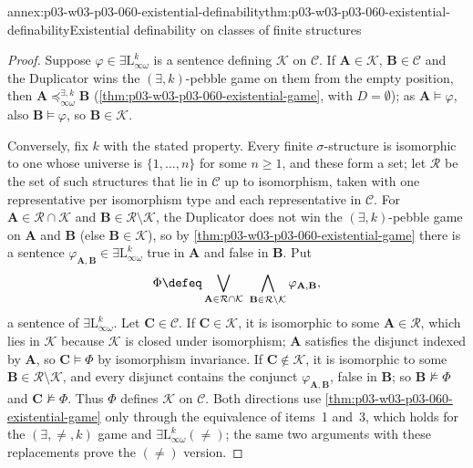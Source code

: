 \begin{annexitem}{annex:p03-w03-p03-060-existential-definability}{thm:p03-w03-p03-060-existential-definability}{Existential definability on classes of finite structures}
\begin{proof}
Suppose \(\varphi\in\exists\mathrm{L}^k_{\infty\omega}\) is a sentence
defining \(\mathcal K\) on \(\mathcal C\). If \(\mathbf A\in\mathcal K\),
\(\mathbf B\in\mathcal C\) and the Duplicator wins the
\((\exists,k)\)-pebble game on them from the empty position, then
\(\mathbf A\preceq^{\exists,k}_{\infty\omega}\mathbf B\)
(\cref{thm:p03-w03-p03-060-existential-game}, with \(D=\emptyset\)); as
\(\mathbf A\models\varphi\), also \(\mathbf B\models\varphi\), so
\(\mathbf B\in\mathcal K\).

Conversely, fix \(k\) with the stated property. Every finite
\(\sigma\)-structure is isomorphic to one whose universe is
\(\{1,\ldots,n\}\) for some \(n\ge1\), and these form a set; let
\(\mathcal R\) be the set of such structures that lie in \(\mathcal C\) up
to isomorphism, taken with one representative per isomorphism type and
each representative in \(\mathcal C\). For
\(\mathbf A\in\mathcal R\cap\mathcal K\) and
\(\mathbf B\in\mathcal R\setminus\mathcal K\), the Duplicator does not win
the \((\exists,k)\)-pebble game on \(\mathbf A\) and \(\mathbf B\) (else
\(\mathbf B\in\mathcal K\)), so by
\cref{thm:p03-w03-p03-060-existential-game} there is a sentence
\(\varphi_{\mathbf A,\mathbf B}\in\exists\mathrm{L}^k_{\infty\omega}\) true
in \(\mathbf A\) and false in \(\mathbf B\). Put
\[
 \Phi\defeq\bigvee_{\mathbf A\in\mathcal R\cap\mathcal K}\ \bigwedge_{\mathbf B\in\mathcal R\setminus\mathcal K}\varphi_{\mathbf A,\mathbf B},
\]
a sentence of \(\exists\mathrm{L}^k_{\infty\omega}\). Let
\(\mathbf C\in\mathcal C\). If \(\mathbf C\in\mathcal K\), it is isomorphic
to some \(\mathbf A\in\mathcal R\), which lies in \(\mathcal K\) because
\(\mathcal K\) is closed under isomorphism; \(\mathbf A\) satisfies the
disjunct indexed by \(\mathbf A\), so \(\mathbf C\models\Phi\) by
isomorphism invariance. If \(\mathbf C\notin\mathcal K\), it is isomorphic
to some \(\mathbf B\in\mathcal R\setminus\mathcal K\), and every disjunct
contains the conjunct \(\varphi_{\mathbf A,\mathbf B}\), false in
\(\mathbf B\); so \(\mathbf B\not\models\Phi\) and
\(\mathbf C\not\models\Phi\). Thus \(\Phi\) defines \(\mathcal K\) on
\(\mathcal C\). Both directions use
\cref{thm:p03-w03-p03-060-existential-game} only through the equivalence
of items~1 and~3, which holds for the \((\exists,\neq,k)\) game and
\(\exists\mathrm{L}^k_{\infty\omega}(\neq)\); the same two arguments with
these replacements prove the \((\neq)\) version.
\end{proof}
\end{annexitem}

